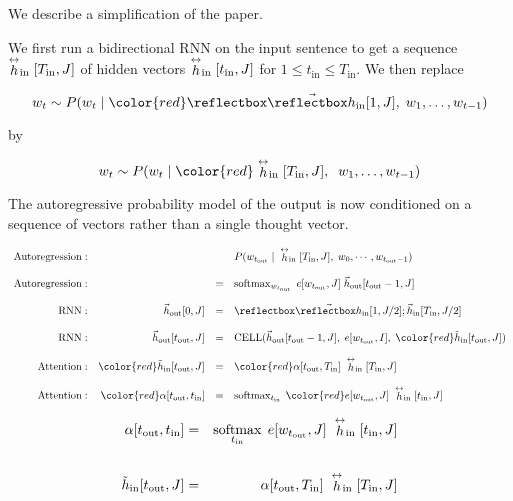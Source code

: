 {\vfill
We describe a simplification of the paper.

We first run a bidirectional RNN on the
input sentence to get a {\color{red} sequence} $\stackrel{\leftrightarrow}{h}_\mathrm{in}[T_{\mathrm{in}},J]$ of hidden vectors $\stackrel{\leftrightarrow}{h}_\mathrm{in}[t_\mathrm{in},J]$ for $1 \leq t_\mathrm{in} \leq T_{\mathrm{in}}$.
We then replace

$$w_t \sim P(w_t\;|\;{\color{red} \cev{h}_{\mathrm{in}}[1,J]},\;w_1,\ldots,w_{t-1})$$

\vfill
by

$$w_t \sim P(w_t\;|\;{\color{red} \dvec{h}_\mathrm{in}[T_{\mathrm{in}},J]},\;\;w_1,\ldots,w_{t-1})$$

\vfill
The autoregressive probability model of the output is now conditioned on a sequence of vectors rather than a single thought vector.

{\huge
$$\begin{array}{rrcl}
        \mathrm{Autoregression:}    &    & &    P(w_{t_\mathrm{out}}\;|\;\dvec{h}_\mathrm{in}[T_{\mathrm{in}},J],\;w_0,\cdots,w_{{t_\mathrm{out}}-1}) \\
        \\
        \mathrm{Autoregression:} &   & = & \softmax_{w_{t_\mathrm{out}}}\;e[w_{t_\mathrm{out}},J]\;\vec{h}_\mathrm{out}[t_\mathrm{out}-1,J] \\
   \\
   \mathrm{RNN:} &\vec{h}_\mathrm{out}[0,J] & = & \cev{h}_\mathrm{in}[1,J/2];\vec{h}_\mathrm{in}[T_\mathrm{in},J/2] \\
   \\
  \mathrm{RNN:} & \vec{h}_\mathrm{out}[t_\mathrm{out},J] & = & \mathrm{CELL}(\vec{h}_\mathrm{out}[t_{\mathrm{out}}-1,J],\;e[w_{t_\mathrm{out}},I],\;{\color{red} \tilde{h}_\mathrm{in}[t_\mathrm{out},J]}) \\
  \\
  \mathrm{Attention:} & {\color{red} \tilde{h}_\mathrm{in}[t_\mathrm{out},J]} & = & {\color{red} \alpha[t_\mathrm{out},T_{\mathrm{in}}]}\;\dvec{h}_\mathrm{in}[T_{\mathrm{in}},J] \\
  \\
  \mathrm{Attention:} & {\color{red} \alpha[t_\mathrm{out},t_{\mathrm{in}}]} & =& \softmax_{t_\mathrm{in}} \;{\color{red} e[w_{t_\mathrm{out}},J]}\;\dvec{h}_\mathrm{in}[t_{\mathrm{in}},J]
  \end{array}$$
}

\begin{eqnarray*}
  \alpha[t_\mathrm{out},t_{\mathrm{in}}]& =& \operatorname*{softmax}_{t_\mathrm{in}} \;e[w_{t_\mathrm{out}},J]\;\stackrel{\leftrightarrow}{h}_\mathrm{in}[t_{\mathrm{in}},J] \\
\\
\tilde{h}_\mathrm{in}[t_\mathrm{out},J]& = & \alpha[t_\mathrm{out},T_{\mathrm{in}}]\;\stackrel{\leftrightarrow}{h}_\mathrm{in}[T_{\mathrm{in}},J]
\end{eqnarray*}

}
